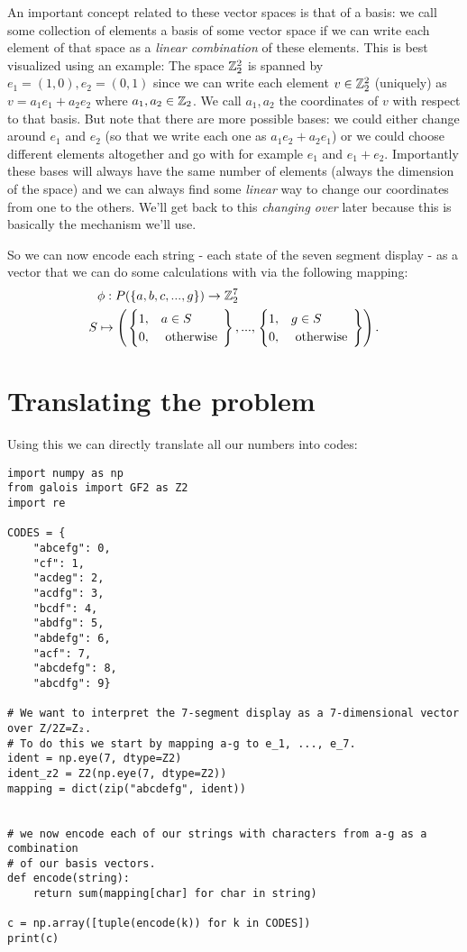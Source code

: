 \documentclass[a4paper,11pt]{article}
\begin{document}
An important concept related to these vector spaces is that of a basis: we call some collection of elements a basis of some vector space if we can write each element of that space as a \emph{linear combination} of these elements. This is best visualized using an example:
The space $\mathbb{Z}_2^2$ is spanned by $e_1 = (1,0), e_2 = (0,1)$ since we can write each element $v \in \mathbb{Z}_2^2$ (uniquely) as $v=a_1 e_1 + a_2 e_2$ where $a_1, a_2 \in \mathbb{Z}_2$. We call $a_1, a_2$ the coordinates of $v$ with respect to that basis. But note that there are more possible bases: we could either change around $e_1$ and $e_2$ (so that we write each one as $a_1 e_2 + a_2 e_1$) or we could choose different elements altogether and go with for example $e_1$ and $e_1+e_2$. Importantly these bases will always have the same number of elements (always the dimension of the space) and we can always find some \emph{linear} way to change our coordinates from one to the others. We'll get back to this \emph{changing over} later because this is basically the mechanism we'll use.

So we can now encode each string - each state of the seven segment display - as a vector that we can do some calculations with via the following mapping:
\begin{align}
     & \phi : P(\{a,b,c,...,g\}) \to \mathbb{Z}_2^7 \\S &\mapsto \left(\left.\begin{cases}
            1, & a \in S            \\
            0, & \text{ otherwise }
        \end{cases} \right\}, ..., \left.\begin{cases}
            1, & g \in S            \\
            0, & \text{ otherwise }
        \end{cases}\right\}\right).
\end{align}

\section{Translating the problem}

Using this we can directly translate all our numbers into codes:
\begin{verbatim}
import numpy as np
from galois import GF2 as Z2
import re

CODES = {
    "abcefg": 0,
    "cf": 1,
    "acdeg": 2,
    "acdfg": 3,
    "bcdf": 4,
    "abdfg": 5,
    "abdefg": 6,
    "acf": 7,
    "abcdefg": 8,
    "abcdfg": 9}

# We want to interpret the 7-segment display as a 7-dimensional vector over Z/2Z=Z₂.
# To do this we start by mapping a-g to e_1, ..., e_7.
ident = np.eye(7, dtype=Z2)
ident_z2 = Z2(np.eye(7, dtype=Z2))
mapping = dict(zip("abcdefg", ident))


# we now encode each of our strings with characters from a-g as a combination
# of our basis vectors.
def encode(string):
    return sum(mapping[char] for char in string)

c = np.array([tuple(encode(k)) for k in CODES])
print(c)
\end{verbatim}
\end{document}
